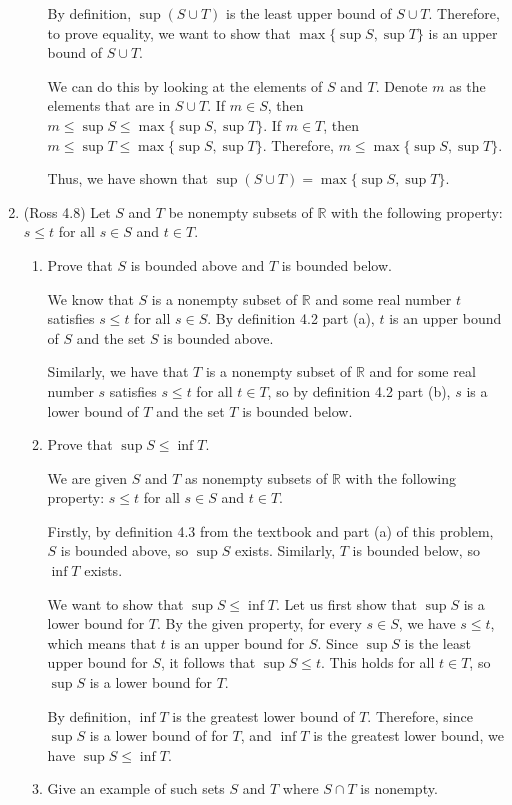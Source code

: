 \documentclass [10pt]{article}
\newcommand{\jg}[1]{{\color{blue} #1}}
\begin{document}
\begin{enumerate}
\begin{enumerate}
{By definition, $\sup (S\cup T)$ is the least upper bound of $S \cup T$. Therefore, to prove equality, we want to show that $\max \{ \sup S, \sup T\}$ is an upper bound of $S \cup T$. 

We can do this by looking at the elements of $S$ and $T$. Denote $m$ as the elements that are in $S \cup T$. If $m \in S$, then $m \leq \sup S \leq \max \{ \sup S, \sup T\}$. If $m \in T$, then $m \leq \sup T \leq \max \{ \sup S, \sup T\}$. Therefore, $m \leq \max \{ \sup S, \sup T\}$. 

Thus, we have shown that $\sup (S \cup T) = \max \{ \sup S, \sup T\}$.
}
\end{enumerate}
\clearpage
\item (Ross 4.8) Let $S$ and $T$ be nonempty subsets of $\mathbb{R}$ with the
following property: $s \leq t$ for all $s \in S$ and $t \in T$.
\begin{enumerate}
\item Prove that $S$ is bounded above and $T$ is bounded below.

\jg{
We know that $S$ is a nonempty subset of $\mathbb{R}$ and some real number $t$ satisfies $s \leq t$ for all $s \in S$. By definition 4.2 part (a), $t$ is an upper bound of $S$ and the set $S$ is bounded above. 

Similarly, we have that $T$ is a nonempty subset of $\mathbb{R}$ and for some real number $s$ satisfies $s \leq t$ for all $t \in T$, so by definition 4.2 part (b), $s$ is a lower bound of $T$ and the set $T$ is bounded below. 
}

\item Prove that $\sup S \leq \inf T$.

\jg{
We are given $S$ and $T$ as nonempty subsets of $\mathbb{R}$ with the following property: $s \leq t$ for all $s \in S$ and $t \in T$. 

Firstly, by definition 4.3 from the textbook and part (a) of this problem, $S$ is bounded above, so $\sup S$ exists. Similarly, $T$ is bounded below, so $\inf T$ exists. 

We want to show that $\sup S \leq \inf T$. Let us first show that $\sup S$ is a lower bound for $T$. By the given property, for every $s \in S$, we have $s \leq t$, which means that $t$ is an upper bound for $S$. Since $\sup S$ is the least upper bound for $S$, it follows that $\sup S \leq t$. This holds for all $t \in T$, so $\sup S$ is a lower bound for $T$. 

By definition, $\inf T$ is the greatest lower bound of $T$. Therefore, since $\sup S$ is a lower bound of for $T$, and $\inf T$ is the greatest lower bound, we have $\sup S \leq \inf T$. 
}
\item Give an example of such sets $S$ and $T$ where $S \cap T$ is
nonempty.


\end{enumerate}
\end{enumerate}
\end{document}
